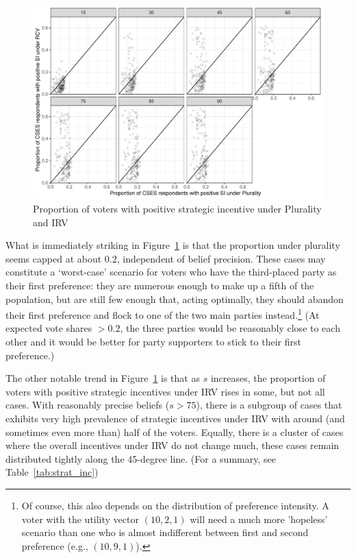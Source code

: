 \documentclass[11pt, letter]{article}
\begin{document}
\begin{figure}[!h]
	\centering
	\includegraphics[width = .8 \textwidth]{"../output/figures/cses_prop"}
	\caption{Proportion of voters with positive strategic incentive under Plurality and IRV}
	\label{fig:sv_dist}
\end{figure}

What is immediately striking in Figure~\ref{fig:sv_dist} is that the proportion under plurality seems capped at about 0.2, independent of belief precision. These cases may constitute a `worst-case' scenario for voters who have the third-placed party as their first preference: they are numerous enough to make up a fifth of the population, but are still few enough that, acting optimally, they should abandon their first preference and flock to one of the two main parties instead.\footnote{Of course, this also depends on the distribution of preference intensity. A voter with the utility vector $(10, 2, 1)$ will need a much more 'hopeless' scenario than one who is almost indifferent between first and second preference (e.g., $(10, 9, 1)$).} (At expected vote shares $> 0.2$, the three parties would be reasonably close to each other and it would be better for party supporters to stick to their first preference.)

The other notable trend in Figure~\ref{fig:sv_dist} is that as $s$ increases, the proportion of voters with positive strategic incentives under IRV rises in some, but not all cases. With reasonably precise beliefs ($s > 75$), there is a subgroup of cases that exhibits very high prevalence of strategic incentives under IRV with around (and sometimes even more than) half of the voters. Equally, there is a cluster of cases where the overall incentives under IRV do not change much, these cases remain distributed tightly along the 45-degree line. (For a summary, see Table~\ref{tab:strat_inc})
\end{document}
